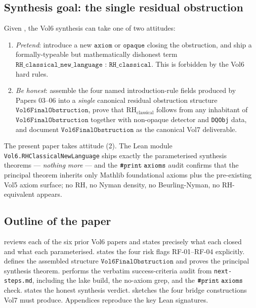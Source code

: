 \documentclass[11pt]{article}
\theoremstyle{plain}
\theoremstyle{definition}
\theoremstyle{remark}
\newcommand{\code}[1]{\texttt{#1}}
\newcommand{\RH}{\mathrm{RH}_{\mathrm{classical}}}
\begin{document}
\subsection{Synthesis goal: the single residual obstruction}
\label{sec:synthesis-goal}

Given , the Vol6 synthesis can take one of
two attitudes:

\begin{enumerate}
  \item \emph{Pretend}: introduce a new \(\code{axiom}\) or
        \(\code{opaque}\) closing the obstruction, and ship a
        formally-typeable but mathematically dishonest term
        \(\code{RH\_classical\_new\_language : RH\_classical}\). This
        is forbidden by the Vol6 hard rules.
  \item \emph{Be honest}: assemble the four named introduction-rule
        fields produced by Papers 03--06 into a \emph{single} canonical
        residual obstruction structure
        \(\code{Vol6FinalObstruction}\), prove that \(\RH\) follows
        from any inhabitant of \(\code{Vol6FinalObstruction}\)
        together with non-opaque detector and \code{DQObj}
        data, and document
        \(\code{Vol6FinalObstruction}\) as the canonical Vol7
        deliverable.
\end{enumerate}

The present paper takes attitude (2). The Lean module
\code{Vol6.RHClassicalNewLanguage} ships exactly the parameterised
synthesis theorems --- \emph{nothing more} --- and the
\(\code{\#print\;axioms}\) audit confirms that the principal theorem
inherits only Mathlib foundational axioms plus the pre-existing Vol5
axiom surface; no RH, no Nyman density, no Beurling-Nyman, no
RH-equivalent appears.

\subsection{Outline of the paper}

 reviews each of the six prior Vol6 papers and
states precisely what each closed and what each parameterised.
 states the four risk flags
RF-01--RF-04 explicitly.  defines the assembled
structure \(\code{Vol6FinalObstruction}\) and proves the
principal synthesis theorem.  performs the
verbatim success-criteria audit from \code{next-steps.md}, including
the lake build, the no-axiom grep, and the
\(\code{\#print\;axioms}\) check.  states the
honest synthesis verdict.  sketches the four
bridge constructions Vol7 must produce. Appendices reproduce the
key Lean signatures.
\end{document}
